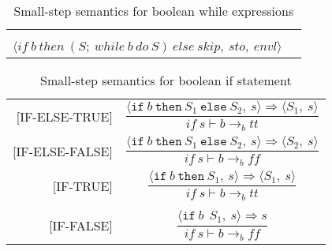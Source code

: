 \begin{table}[H]
    \centering
    \begin{longtable}[c] { r c }
    
    \begin{tabular}{@{}c@{}} 
    [WHILE] \\
    \newline
    \end{tabular} 
  \begin{tabular}{@{}c@{}}   \(
  \langle while \ b \ do \ S, \ sto, \ envl \rangle \Rightarrow
  \)  \\ \(
  \langle if \ b \ then \ (S; \ while \ b \ do \ S) \ else \ skip, \ sto, \ envl \rangle
  \) 
  \end{tabular}
        
 \end{longtable}
    \caption{Small-step semantics for boolean while expressions}\label{tab:my_label}
\end{table}



\iffalse

\begin{table}[H]
    \centering
    \begin{longtable}[c] { r c }
        
        [IF-ELSE-TRUE] & \( \dfrac{\langle \texttt{if} \ b \ \texttt{then} \ S_1 \ \texttt{else} \ S_2,\ s \rangle \Rightarrow \langle S_1,\ s\rangle}{if\ s\vdash b \rightarrow_b tt} \) \\[4ex]
        
        [IF-ELSE-FALSE] & \( \dfrac{\langle \texttt{if} \ b \ \texttt{then} \ S_1 \ \texttt{else} \ S_2,\ s \rangle \Rightarrow \langle S_2,\ s \rangle}{if\ s\vdash b \rightarrow_b ff} \) \\[4ex]
        
        [IF-TRUE] & \( \dfrac{\langle \texttt{if} \ b \ \texttt{then} \ S_1,\ s \rangle \Rightarrow \langle S_1,\ s \rangle}{if \ s\vdash b \rightarrow_b tt} \) \\\\
        
        [IF-FALSE] & \( \dfrac{\langle \texttt{if} \ b \ \texttt \ S_1,\ s \rangle \Rightarrow s}{if\ s\vdash b \rightarrow_b ff} \) \\[4ex]
        
 \end{longtable}
    \caption{Small-step semantics for boolean if statement}\label{tab:my_label}
\end{table}
        
